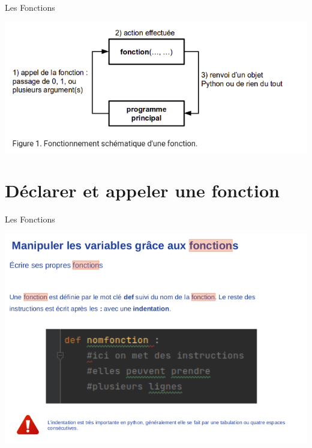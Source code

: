 \documentclass[xcolor=table]{beamer}
\begin{document}
\begin{frame}{Les Fonctions}

\includegraphics[scale=0.5]{images/fonctions.png}
    
\end{frame}

\section{Déclarer et appeler une fonction}

\begin{frame}{Les Fonctions}

\includegraphics[scale=0.5]{images/fonction_2.png}
    
\end{frame}
\end{document}
